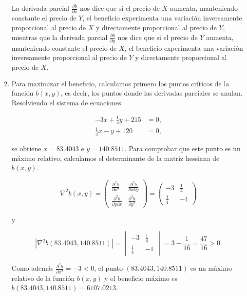 \documentclass[
  spanish,
  a4paper,
]{scrreport}
\theoremstyle{definition}
\theoremstyle{remark}
\begin{document}
\begin{tcolorbox}
\begin{enumerate}
  La derivada parcial \(\frac{\partial b}{\partial x}\) nos dice que si
  el precio de \(X\) aumenta, manteniendo constante el precio de \(Y\),
  el beneficio experimenta una variación inversamente proporcional al
  precio de \(X\) y directamente proporcional al precio de \(Y\),
  mientras que la derivada parcial \(\frac{\partial b}{\partial y}\) nos
  dice que si el precio de \(Y\) aumenta, manteniendo constante el
  precio de \(X\), el beneficio experimenta una variación inversamente
  proporcional al precio de \(Y\) y directamente proporcional al precio
  de \(X\).
\item
  Para maximizar el beneficio, calculamos primero los puntos críticos de
  la función \(b(x,y)\), es decir, los puntos donde las derivadas
  parciales se anulan. Resolviendo el sistema de ecuaciones

  \begin{align*}
  -3x + \frac{1}{4}y + 215 &= 0, \\
  \frac{1}{4}x - y + 120 &= 0,
  \end{align*}

  se obtiene \(x=83.4043\) e \(y=140.8511\). Para comprobar que este
  punto es un máximo relativo, calculamos el determinante de la matriz
  hessiana de \(b(x,y)\).

  \[
  \nabla^2 b(x,y) = 
  \begin{pmatrix}
  \frac{\partial^2 b}{\partial x^2} & \frac{\partial^2 b}{\partial x \partial y} \\
  \frac{\partial^2 b}{\partial y \partial x} & \frac{\partial^2 b}{\partial y^2}
  \end{pmatrix}
  =
  \begin{pmatrix}
  -3 & \frac{1}{4} \\
  \frac{1}{4} & -1
  \end{pmatrix}
  \]

  y

  \[
  |\nabla^2 b(83.4043, 140.8511)| = 
  \begin{vmatrix}
  -3 & \frac{1}{4} \\
  \frac{1}{4} & -1
  \end{vmatrix}
  = 3 - \frac{1}{16} = \frac{47}{16} > 0.
  \]

  Como además \(\frac{\partial^2 b}{\partial x^2} = -3 < 0\), el punto
  \((83.4043, 140.8511)\) es un máximo relativo de la función \(b(x,y)\)
  y el beneficio máximo es \(b(83.4043, 140.8511) = 6107.0213\).
\end{enumerate}

\end{tcolorbox}
\end{document}
